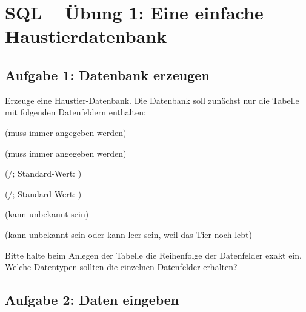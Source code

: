 \clearpage

\rehead[]{\textcolor{lightblue}{AvHG, Inf, My}}
\lohead[]{\textcolor{lightblue}{AvHG, Inf, My}}

\section{SQL -- Übung 1: Eine einfache Haustierdatenbank}

\subsection{Aufgabe 1: Datenbank erzeugen}

Erzeuge eine Haustier-Datenbank. Die Datenbank soll zunächst nur die Tabelle
 mit folgenden Datenfeldern enthalten:

\begin{compactitem}
  \item {} (muss immer angegeben werden)
  \item {} (muss immer angegeben werden)
  \item {} (/;
  Standard-Wert: )
  \item {}
  (/; Standard-Wert:
  )
  \item {} (kann unbekannt sein)
  \item {} (kann unbekannt sein oder kann leer sein, weil
  das Tier noch lebt)
\end{compactitem}

Bitte halte beim Anlegen der Tabelle die Reihenfolge der Datenfelder exakt ein.
Welche Datentypen sollten die einzelnen Datenfelder erhalten?


\subsection{Aufgabe 2: Daten eingeben}

